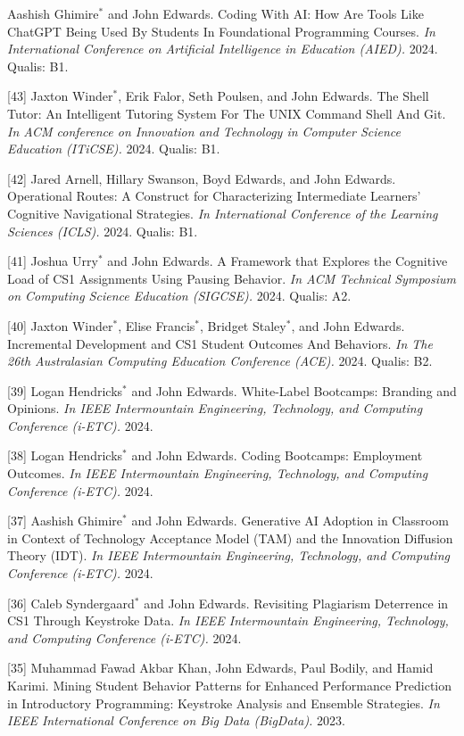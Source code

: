 \documentclass[margin,line]{res}
\newcommand{\cnum}[1]{[#1]}
\begin{document}
\begin{resume}
\cnum{44} Aashish Ghimire$^*$ and John Edwards. Coding With AI: How Are Tools Like ChatGPT Being Used By Students In Foundational Programming Courses. \textit{In International Conference on Artificial Intelligence in Education (AIED).} 2024. Qualis: B1.

\cnum{43} Jaxton Winder$^*$, Erik Falor, Seth Poulsen, and John Edwards. The Shell Tutor: An Intelligent Tutoring System For The UNIX Command Shell And Git. \textit{In ACM conference on Innovation and Technology in Computer Science Education (ITiCSE).} 2024. Qualis: B1.

\cnum{42} Jared Arnell, Hillary Swanson, Boyd Edwards, and John Edwards. Operational Routes: A Construct for Characterizing Intermediate Learners’ Cognitive Navigational Strategies. \textit{In International Conference of the Learning Sciences (ICLS).} 2024. Qualis: B1.

\cnum{41} Joshua Urry$^*$ and John Edwards. A Framework that Explores the Cognitive Load of CS1 Assignments Using Pausing Behavior. \textit{In ACM Technical Symposium on Computing Science Education (SIGCSE).} 2024. Qualis: A2.

\cnum{40} Jaxton Winder$^*$, Elise Francis$^*$, Bridget Staley$^*$, and John Edwards. Incremental Development and CS1 Student Outcomes And Behaviors. \textit{In The 26th Australasian Computing Education Conference (ACE).} 2024. Qualis: B2.

\cnum{39} Logan Hendricks$^*$ and John Edwards. White-Label Bootcamps: Branding and Opinions. \textit{In IEEE Intermountain Engineering, Technology, and Computing Conference (i-ETC).} 2024.

\cnum{38} Logan Hendricks$^*$ and John Edwards. Coding Bootcamps: Employment Outcomes. \textit{In IEEE Intermountain Engineering, Technology, and Computing Conference (i-ETC).} 2024.

\cnum{37} Aashish Ghimire$^*$ and John Edwards. Generative AI Adoption in Classroom in Context of Technology Acceptance Model (TAM) and the Innovation Diffusion Theory (IDT). \textit{In IEEE Intermountain Engineering, Technology, and Computing Conference (i-ETC).} 2024.

\cnum{36} Caleb Syndergaard$^*$ and John Edwards. Revisiting Plagiarism Deterrence in CS1 Through Keystroke Data. \textit{In IEEE Intermountain Engineering, Technology, and Computing Conference (i-ETC).} 2024.

\cnum{35} Muhammad Fawad Akbar Khan, John Edwards, Paul Bodily, and Hamid Karimi. Mining Student Behavior Patterns for Enhanced Performance Prediction in Introductory Programming: Keystroke Analysis and Ensemble Strategies. \textit{In IEEE International Conference on Big Data (BigData).} 2023.


\end{resume}
\end{document}
